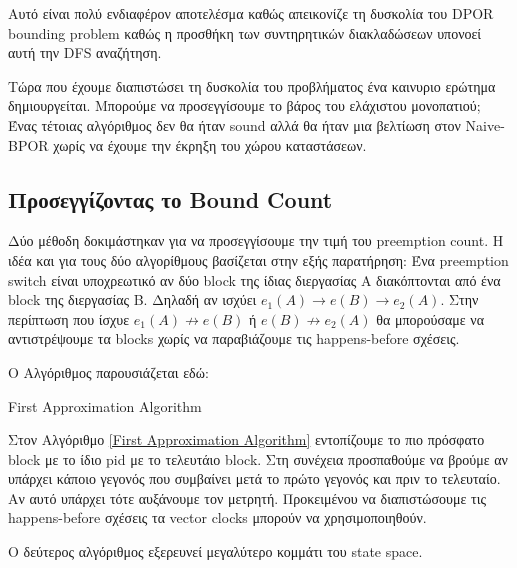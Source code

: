 Αυτό είναι πολύ ενδιαφέρον αποτελέσμα καθώς απεικονίζε τη δυσκολία του DPOR bounding problem καθώς η προσθήκη των συντηρητικών διακλαδώσεων
υπονοεί αυτή την DFS αναζήτηση.

Τώρα που έχουμε διαπιστώσει τη δυσκολία του προβλήματος ένα καινυριο ερώτημα δημιουργείται. Μπορούμε να προσεγγίσουμε το βάρος του ελάχιστου μονοπατιού;
Ένας τέτοιας αλγόριθμος δεν θα ήταν sound αλλά θα ήταν μια βελτίωση στον Naive-BPOR χωρίς να έχουμε την έκρηξη του χώρου καταστάσεων.

\subsection{Προσεγγίζοντας το Bound Count}
Δύο μέθοδη δοκιμάστηκαν για να προσεγγίσουμε την τιμή του preemption count. Η ιδέα και για τους δύο αλγορίθμους βασίζεται στην εξής παρατήρηση:
Ένα preemption switch είναι υποχρεωτικό αν δύο block της ίδιας διεργασίας A διακόπτονται από ένα block της διεργασίας B.
Δηλαδή αν ισχύει $e_1(A) \rightarrow e(B) \rightarrow e_2(A)$. Στην περίπτωση που ίσχυε $e_1(A) \not \rightarrow e(B)$ ή
$e(B) \not \rightarrow e_2(A)$ θα μπορούσαμε να αντιστρέψουμε τα blocks χωρίς να παραβιάζουμε τις happens-before σχέσεις.

Ο Αλγόριθμος παρουσιάζεται εδώ:\\

\begin{algorithm}[H]
    \caption{First Approximation Algorithm}
    \label{First Approximation Algorithm}
\end{algorithm}

Στον Αλγόριθμο \ref{First Approximation Algorithm} εντοπίζουμε το πιο πρόσφατο block με το ίδιο pid με το τελευτάιο block. Στη συνέχεια προσπαθούμε να βρούμε αν υπάρχει κάποιο
γεγονός που συμβαίνει μετά το πρώτο γεγονός και πριν το τελευταίο.
Αν αυτό υπάρχει τότε αυξάνουμε τον μετρητή.
Προκειμένου να διαπιστώσουμε τις happens-before σχέσεις τα vector clocks μπορούν να χρησιμοποιηθούν.

Ο δεύτερος αλγόριθμος εξερευνεί μεγαλύτερο κομμάτι του state space.\\

